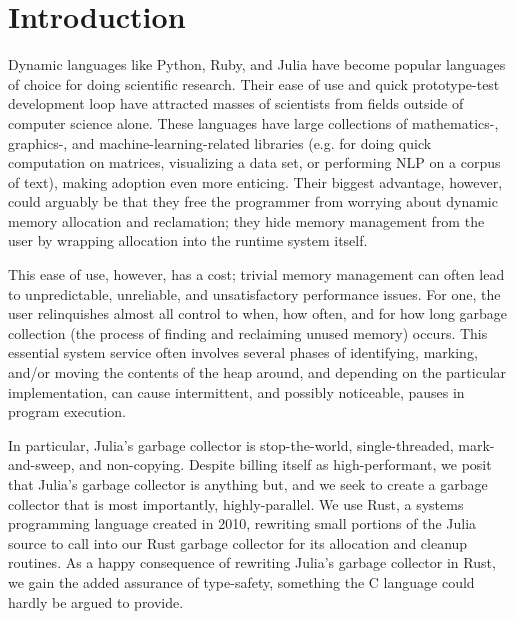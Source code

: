 \section{Introduction} \label{introduction}
Dynamic languages like Python, Ruby, and Julia have become popular languages of choice for doing scientific research.
Their ease of use and quick prototype-test development loop have attracted masses of scientists from fields outside of computer science alone.
These languages have large collections of mathematics-, graphics-, and machine-learning-related libraries (e.g. for doing quick computation on matrices, visualizing a data set, or performing NLP on a corpus of text), making adoption even more enticing.
Their biggest advantage, however, could arguably be that they free the programmer from worrying about dynamic memory allocation and reclamation; they hide memory management from the user by wrapping allocation into the runtime system itself.

This ease of use, however, has a cost; trivial memory management can often lead to unpredictable, unreliable, and unsatisfactory performance issues.
For one, the user relinquishes almost all control to when, how often, and for how long garbage collection (the process of finding and reclaiming unused memory) occurs.
This essential system service often involves several phases of identifying, marking, and/or moving the contents of the heap around, and depending on the particular implementation, can cause intermittent, and possibly noticeable, pauses in program execution.

In particular, Julia's garbage collector is stop-the-world, single-threaded, mark-and-sweep, and non-copying.
Despite billing itself as high-performant, we posit that Julia's garbage collector is anything but, and we seek to create a garbage collector that is most importantly, highly-parallel.
We use Rust, a systems programming language created in 2010, rewriting small portions of the Julia source to call into our Rust garbage collector for its allocation and cleanup routines.
As a happy consequence of rewriting Julia's garbage collector in Rust, we gain the added assurance of type-safety, something the C language could hardly be argued to provide.

